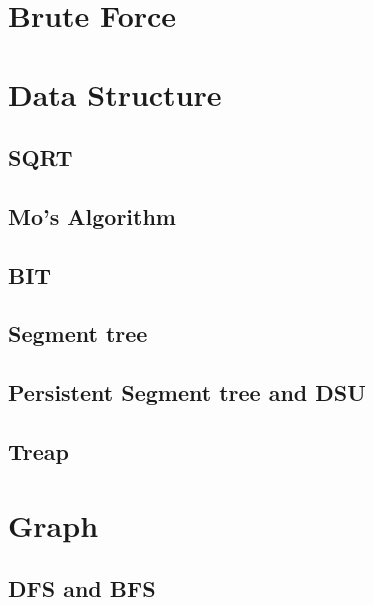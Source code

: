 \section{Brute Force}


\section{Data Structure}

\subsection{SQRT}


\subsection{Mo's Algorithm}


\subsection{BIT}


\subsection{Segment tree}


\subsection{Persistent Segment tree and DSU}


\subsection{Treap}


\section{Graph}

\subsection{DFS and BFS}


